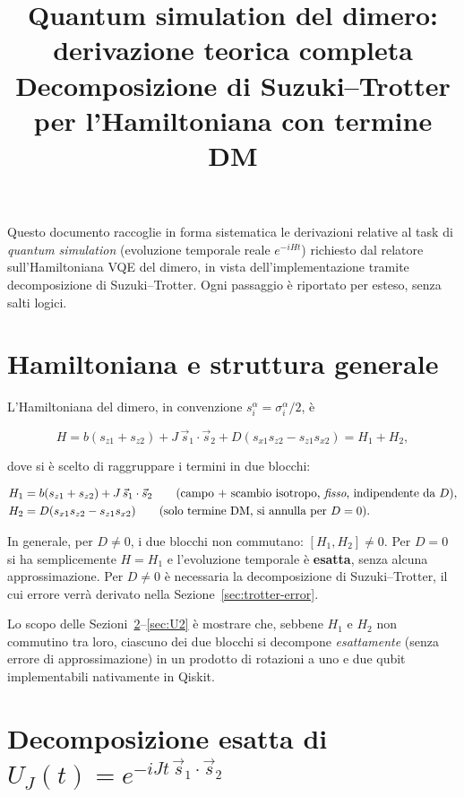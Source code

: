 \documentclass[11pt,a4paper]{article}
\title{Quantum simulation del dimero: derivazione teorica completa\\
\large Decomposizione di Suzuki--Trotter per l'Hamiltoniana con termine DM}
\author{}
\date{}
\begin{document}
\maketitle
\tableofcontents

\bigskip
\noindent Questo documento raccoglie in forma sistematica le derivazioni relative al task di \emph{quantum simulation} (evoluzione temporale reale $e^{-iHt}$) richiesto dal relatore sull'Hamiltoniana VQE del dimero, in vista dell'implementazione tramite decomposizione di Suzuki--Trotter. Ogni passaggio è riportato per esteso, senza salti logici.

\section{Hamiltoniana e struttura generale}

L'Hamiltoniana del dimero, in convenzione $s_i^\alpha = \sigma_i^\alpha/2$, è

\begin{equation}
H = b(s_{z1}+s_{z2}) + J\,\vec s_1\cdot\vec s_2 + D(s_{x1}s_{z2}-s_{z1}s_{x2}) = H_1 + H_2,
\end{equation}

dove si è scelto di raggruppare i termini in due blocchi:

\begin{align}
H_1 &= b(s_{z1}+s_{z2}) + J\,\vec s_1\cdot\vec s_2 \qquad \text{(campo + scambio isotropo, \emph{fisso}, indipendente da } D\text{)},\\
H_2 &= D(s_{x1}s_{z2}-s_{z1}s_{x2}) \qquad \text{(solo termine DM, si annulla per } D=0\text{)}.
\end{align}

In generale, per $D\neq0$, i due blocchi non commutano: $[H_1,H_2]\neq 0$. Per $D=0$ si ha semplicemente $H=H_1$ e l'evoluzione temporale è \textbf{esatta}, senza alcuna approssimazione. Per $D\neq0$ è necessaria la decomposizione di Suzuki--Trotter, il cui errore verrà derivato nella Sezione~\ref{sec:trotter-error}.

Lo scopo delle Sezioni~\ref{sec:UJ}--\ref{sec:U2} è mostrare che, sebbene $H_1$ e $H_2$ non commutino tra loro, ciascuno dei due blocchi si decompone \emph{esattamente} (senza errore di approssimazione) in un prodotto di rotazioni a uno e due qubit implementabili nativamente in Qiskit.

\section{Decomposizione esatta di $U_J(t) = e^{-iJt\,\vec s_1\cdot\vec s_2}$}
\label{sec:UJ}
\end{document}
